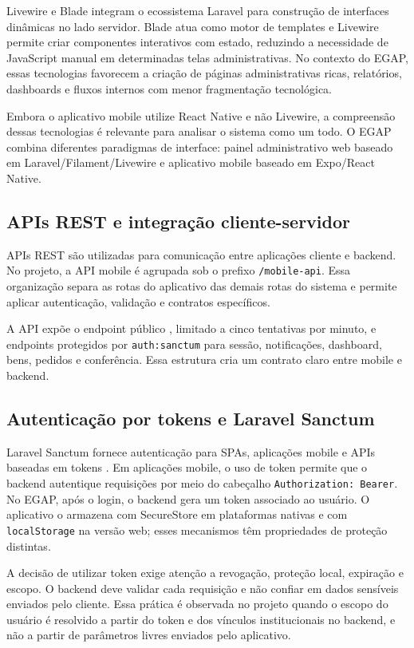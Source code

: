 \documentclass[12pt,a4paper]{article}
\begin{document}
Livewire e Blade integram o ecossistema Laravel para construção de interfaces dinâmicas no lado servidor. Blade atua como motor de templates e Livewire permite criar componentes interativos com estado, reduzindo a necessidade de JavaScript manual em determinadas telas administrativas. No contexto do EGAP, essas tecnologias favorecem a criação de páginas administrativas ricas, relatórios, dashboards e fluxos internos com menor fragmentação tecnológica.

Embora o aplicativo mobile utilize React Native e não Livewire, a compreensão dessas tecnologias é relevante para analisar o sistema como um todo. O EGAP combina diferentes paradigmas de interface: painel administrativo web baseado em Laravel/Filament/Livewire e aplicativo mobile baseado em Expo/React Native.

\subsection{APIs REST e integração cliente-servidor}

APIs REST são utilizadas para comunicação entre aplicações cliente e backend. No projeto, a API mobile é agrupada sob o prefixo \texttt{/mobile-api}. Essa organização separa as rotas do aplicativo das demais rotas do sistema e permite aplicar autenticação, validação e contratos específicos.

A API expõe o endpoint público , limitado a cinco tentativas por minuto, e endpoints protegidos por \texttt{auth:sanctum} para sessão, notificações, dashboard, bens, pedidos e conferência. Essa estrutura cria um contrato claro entre mobile e backend.

\subsection{Autenticação por tokens e Laravel Sanctum}

Laravel Sanctum fornece autenticação para SPAs, aplicações mobile e APIs baseadas em tokens \cite{sanctum}. Em aplicações mobile, o uso de token permite que o backend autentique requisições por meio do cabeçalho \texttt{Authorization: Bearer}. No EGAP, após o login, o backend gera um token associado ao usuário. O aplicativo o armazena com SecureStore em plataformas nativas e com \texttt{localStorage} na versão web; esses mecanismos têm propriedades de proteção distintas.

A decisão de utilizar token exige atenção a revogação, proteção local, expiração e escopo. O backend deve validar cada requisição e não confiar em dados sensíveis enviados pelo cliente. Essa prática é observada no projeto quando o escopo do usuário é resolvido a partir do token e dos vínculos institucionais no backend, e não a partir de parâmetros livres enviados pelo aplicativo.
\end{document}
